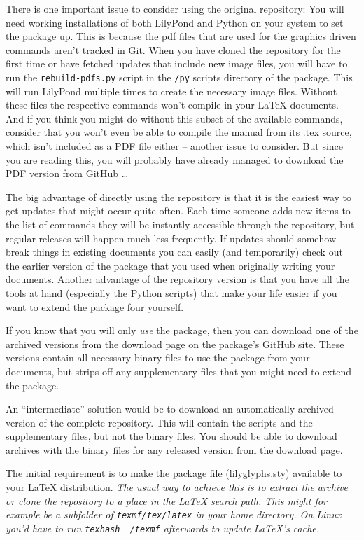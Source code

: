 \documentclass{article}
\begin{document}
There is one important issue to consider using the original repository: You will need working installations of both LilyPond and Python on your system to set the package up.
This is because the pdf files that are used for the graphics driven commands aren't tracked in Git.
When you have cloned the repository for the first time or have fetched updates that include new image files, you will have to run the \texttt{rebuild-pdfs.py} script in the \texttt{/py} scripts directory of the package.
This will run LilyPond multiple times to create the necessary image files.
Without these files the respective commands won't compile in your \LaTeX{} documents.
And if you think you might do without this subset of the available commands, consider that you won't even be able to compile the manual from its .tex source, which isn't included as a PDF file either -- another issue to consider.
But since you are reading this, you will probably have already managed to download the PDF version from GitHub \dots

The big advantage of directly using the repository is that it is the easiest way to get updates that might occur quite often. 
Each time someone adds new items to the list of commands they will be instantly accessible through the repository, but regular releases will happen much less frequently.
If updates should somehow break things in existing documents you can easily (and temporarily) check out the earlier version of the package that you used when originally writing your documents.
Another advantage of the repository version is that you have all the tools at hand (especially the Python scripts) that make your life easier if you want to extend the package four yourself.

If you know that you will only \emph{use} the \lilyglyphs{} package, then you can download one of the archived versions from the download page on the package's GitHub site.
These versions contain all necessary binary files to use the package from your documents, but strips off any supplementary files that you might need to extend the package.

An “intermediate” solution would be to download an automatically archived version of the complete repository. 
This will contain the scripts and the supplementary files, but not the binary files.
You should be able to download archives with the binary files for any released version from the download page.

\medskip
The initial requirement is to make the package file (lilyglyphs.sty) available to your \LaTeX{} distribution. \textit{The usual way to achieve this is to extract the archive or clone the repository to a place in the \LaTeX{} search path. This might for example be a subfolder of \texttt{texmf/tex/latex} in your home directory. On Linux you'd have to run \texttt{texhash ~/texmf} afterwards to update \LaTeX's cache.}
\end{document}
